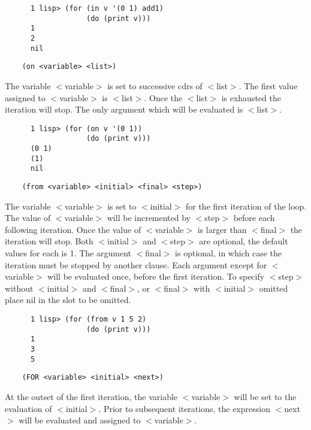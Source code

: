 \begin{verbatim}
      1 lisp> (for (in v '(0 1) add1)
                   (do (print v)))
      1
      2
      nil
\end{verbatim}

\begin{verbatim}
    (on <variable> <list>)
\end{verbatim}
      The variable $<$variable$>$ is set to successive cdrs of $<$list$>$. 
						The
      first value assigned to $<$variable$>$ is $<$list$>$. Once the
						$<$list$>$ is
      exhausted the iteration will stop. The only argument which will be
      evaluated is $<$list$>$.


\begin{verbatim}
      1 lisp> (for (on v '(0 1))
                   (do (print v)))
      (0 1)
      (1)
      nil
\end{verbatim}

\begin{verbatim}
    (from <variable> <initial> <final> <step>)
\end{verbatim}
      The variable $<$variable$>$ is set to $<$initial$>$ for the first
						iteration
      of the loop.  The value of $<$variable$>$ will be incremented by
						$<$step$>$
      before each following iteration.  Once the value of $<$variable$>$ is
      larger than $<$final$>$ the iteration will stop.  Both $<$initial$>$
						and
      $<$step$>$ are optional, the default values for each is 1.  The
						argument
      $<$final$>$ is optional, in which case the iteration must be stopped
      by another clause.  Each argument except for $<$variable$>$ will be
      evaluated once, before the first iteration.  To specify $<$step$>$
      without $<$initial$>$ and $<$final$>$, or $<$final$>$ with
						$<$initial$>$ omitted
      place nil in the slot to be omitted.


\begin{verbatim}
      1 lisp> (for (from v 1 5 2)
                   (do (print v)))
      1
      3
      5
\end{verbatim}

\begin{verbatim}
    (FOR <variable> <initial> <next>)
\end{verbatim}
      At the outset of the first iteration, the variable $<$variable$>$ will
      be set to the evaluation of $<$initial$>$.  Prior to subsequent
						iterations,
      the expression $<$next$>$ will be evaluated and assigned to
						$<$variable$>$.


